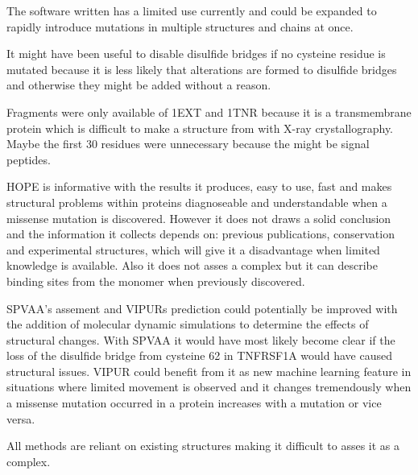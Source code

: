 The software written has a limited use currently and could be expanded to rapidly introduce mutations in multiple structures and chains at once.

It might have been useful to disable disulfide bridges if no cysteine residue is mutated because it is less likely that alterations are formed to disulfide bridges and otherwise they might be added without a reason.

Fragments were only available of 1EXT and 1TNR because it is a transmembrane protein which is difficult to make a structure from with X-ray crystallography.
Maybe the first 30 residues were unnecessary because the might be signal peptides. 

HOPE is informative with the results it produces, easy to use, fast and makes structural problems within proteins diagnoseable and understandable when a missense mutation is discovered. However it does not draws a solid conclusion and the information it collects depends on: previous publications, conservation and experimental structures, which will give it a disadvantage when limited knowledge is available. Also it does not asses a complex but it can describe binding sites from the monomer when previously discovered.


SPVAA's assement and VIPURs prediction could potentially be improved with the addition of molecular dynamic simulations to determine the effects of structural changes. With SPVAA it would have most likely become clear if the loss of the disulfide bridge from cysteine 62 in TNFRSF1A would have caused structural issues. VIPUR could benefit from it as new machine learning feature in situations where limited movement is observed and it changes tremendously when a missense mutation occurred in a protein increases with a mutation or vice versa.



All methods are reliant on existing structures making it difficult to asses it as a complex.
